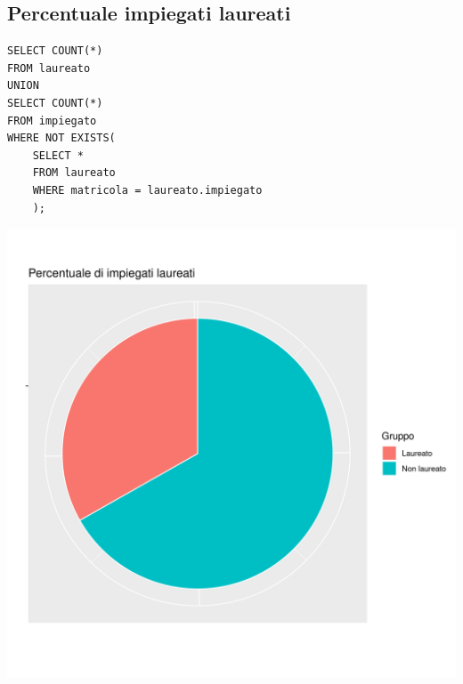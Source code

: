 \documentclass{article}
\begin{document}
\subsection{Percentuale impiegati laureati}
\begin{verbatim}
SELECT COUNT(*) 
FROM laureato 
UNION 
SELECT COUNT(*) 
FROM impiegato 
WHERE NOT EXISTS(
    SELECT * 
    FROM laureato 
    WHERE matricola = laureato.impiegato
    );
\end{verbatim}
\begin{center}
\includegraphics[width=\textwidth]{plot_perc_laureati.png}
\end{center}

\newpage
\end{document}
